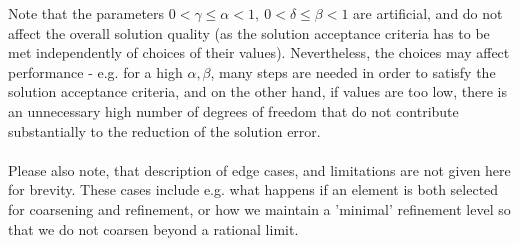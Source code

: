Note that the parameters $0 < \gamma \leq \alpha < 1,\ 0 < \delta \leq \beta < 1$ are artificial, and do not affect the overall solution quality (as the solution acceptance criteria has to be met independently of choices of their values). Nevertheless, the choices may affect performance - e.g. for a high $\alpha, \beta$, many steps are needed in order to satisfy the solution acceptance criteria, and on the other hand, if values are too low, there is an unnecessary high number of degrees of freedom that do not contribute substantially to the reduction of the solution error.
\paragraph{}
Please also note, that description of edge cases, and limitations are not given here for brevity. These cases include e.g. what happens if an element is both selected for coarsening and refinement, or how we maintain a 'minimal' refinement level so that we do not coarsen beyond a rational limit.